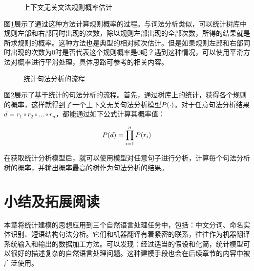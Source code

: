 \begin{figure}[htp]
   \centering

	\caption{上下文无关文法规则概率估计}
    \label{fig:3.4-7}
\end{figure}
\parinterval 图\ref{fig:3.4-7}展示了通过这种方法计算规则概率的过程。与词法分析类似，可以统计树库中规则左部和右部同时出现的次数，除以规则左部出现的全部次数，所得的结果就是所求规则的概率。这种方法也是典型的相对频次估计。但是如果规则左部和右部同时出现的次数为0时是否代表这个规则概率是0呢？遇到这种情况，可以使用平滑方法对概率进行平滑处理，具体思路可参考{\chaptertwo}的相关内容。

\begin{figure}[htp]
    \centering

	\caption{统计句法分析的流程}
    \label{fig:3.4-8}
\end{figure}
\parinterval 图\ref{fig:3.4-8}展示了基于统计的句法分析的流程。首先，通过树库上的统计，获得各个规则的概率，这样就得到了一个上下文无关句法分析模型${P}( \cdot )$。对于任意句法分析结果$d=r_1 \circ r_2 \circ ... \circ r_n$，都能通过如下公式计算其概率值：

\begin{equation}
{P}(d)= \prod_{i=1}^{n}{P}(r_i)
\end{equation}

\parinterval 在获取统计分析模型后，就可以使用模型对任意句子进行分析，计算每个句法分析树的概率，并输出概率最高的树作为句法分析的结果。


\sectionnewpage
\section{小结及拓展阅读} \label{sec3:summary}

\parinterval 本章将统计建模的思想应用到三个自然语言处理任务中，包括：中文分词、命名实体识别、短语结构句法分析。它们和机器翻译有着紧密的联系，往往作为机器翻译系统输入和输出的数据加工方法。可以发现：经过适当的假设和化简，统计模型可以很好的描述复杂的自然语言处理问题。这种建模手段也会在后续章节的内容中被广泛使用。

